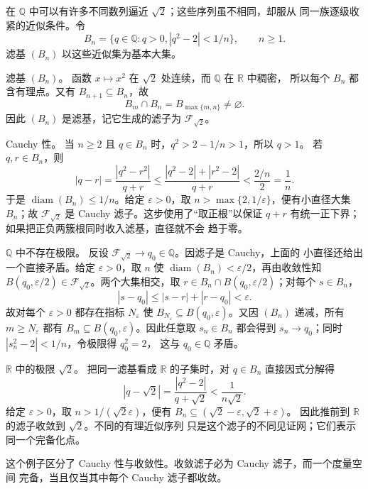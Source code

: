 \begin{example}
\label{ch1:exa:worked-sqrt-two-filter}
在 $\mathbb Q$ 中可以有许多不同数列逼近 $\sqrt2$；这些序列虽不相同，却服从
同一族逐级收紧的近似条件。令
\[
 B_n=\{q\in\mathbb Q:q>0, |q^2-2|<1/n\},
 \qquad n\geq1.
\]
滤基 $(B_n)$ 以这些近似集为基本大集。

\medskip
\noindent 滤基 $(B_n)$。
函数 $x\mapsto x^2$ 在 $\sqrt2$ 处连续，而 $\mathbb Q$ 在 $\mathbb R$ 中稠密，
所以每个 $B_n$ 都含有理点。又有 $B_{n+1}\subseteq B_n$，故
\[
 B_m\cap B_n=B_{\max\{m,n\}}\neq\varnothing.
\]
因此 $(B_n)$ 是滤基，记它生成的滤子为 $\mathcal F_{\sqrt2}$。

\medskip
\noindent Cauchy 性。
当 $n\geq2$ 且 $q\in B_n$ 时，$q^2>2-1/n>1$，所以 $q>1$。
若 $q,r\in B_n$，则
\[
 |q-r|=\frac{|q^2-r^2|}{q+r}
 \leq\frac{|q^2-2|+|r^2-2|}{q+r}
 <\frac{2/n}{2}=\frac1n.
\]
于是 $\operatorname{diam}(B_n)\leq1/n$。给定 $\varepsilon>0$，取
$n>\max\{2,1/\varepsilon\}$，便有小直径大集 $B_n$；故
$\mathcal F_{\sqrt2}$ 是 Cauchy 滤子。这步使用了“取正根”以保证
$q+r$ 有统一正下界；如果把正负两簇根同时收入滤基，直径就不会
趋于零。

\medskip
\noindent $\mathbb Q$ 中不存在极限。
反设 $\mathcal F_{\sqrt2}\to q_0\in\mathbb Q$。因滤子是 Cauchy，上面的
小直径还给出一个直接矛盾。给定 $\varepsilon>0$，取 $n$ 使
$\operatorname{diam}(B_n)<\varepsilon/2$，再由收敛性知
$B(q_0,\varepsilon/2)\in\mathcal F_{\sqrt2}$。两个大集相交，取
$r\in B_n\cap B(q_0,\varepsilon/2)$；对每个 $s\in B_n$，
\[
 |s-q_0|\leq|s-r|+|r-q_0|<\varepsilon.
\]
故对每个 $\varepsilon>0$ 都存在指标 $N_\varepsilon$ 使
$B_{N_\varepsilon}\subseteq B(q_0,\varepsilon)$。又因 $(B_n)$ 递减，所有
$m\geq N_\varepsilon$ 都有 $B_m\subseteq B(q_0,\varepsilon)$。因此任意取
$s_n\in B_n$ 都会得到 $s_n\to q_0$；同时 $|s_n^2-2|<1/n$，令极限得 $q_0^2=2$，
这与 $q_0\in\mathbb Q$ 矛盾。

\medskip
\noindent $\mathbb R$ 中的极限 $\sqrt2$。
把同一滤基看成 $\mathbb R$ 的子集时，对 $q\in B_n$ 直接因式分解得
\[
 |q-\sqrt2|
 =\frac{|q^2-2|}{q+\sqrt2}
 <\frac{1}{n\sqrt2}.
\]
给定 $\varepsilon>0$，取 $n>1/(\sqrt2\varepsilon)$，便有
$B_n\subseteq(\sqrt2-\varepsilon,\sqrt2+\varepsilon)$。
因此推前到 $\mathbb R$ 的滤子收敛到 $\sqrt2$。不同的有理近似序列
只是这个滤子的不同见证网；它们表示同一个完备化点。

\medskip
这个例子区分了 Cauchy 性与收敛性。收敛滤子必为 Cauchy 滤子，而一个度量空间
完备，当且仅当其中每个 Cauchy 滤子都收敛。
\end{example}

